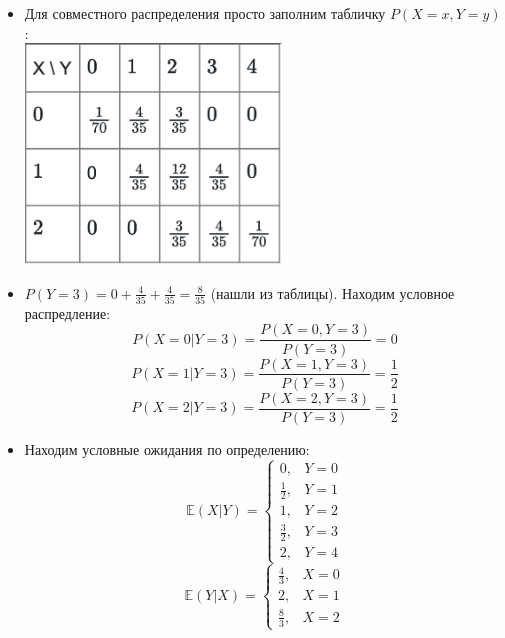 \begin{itemize}
\item Для совместного распределения просто заполним табличку $P\left(X = x, Y = y\right)$: \\
\includegraphics[width=193pt]{img1.png}
\item $P\left(Y = 3\right) = 0 + \frac{4}{35} + \frac{4}{35} = \frac{8}{35}$ (нашли из таблицы). Находим условное распредление:
\[
    P\left(X = 0 | Y = 3\right) = \frac{P\left(X = 0, Y = 3\right)}{P\left(Y = 3\right)} =0 
\]
\[
    P\left(X = 1 | Y = 3\right) = \frac{P\left(X = 1, Y = 3\right)}{P\left(Y = 3\right)} = \frac 1 2
\]
\[
    P\left(X = 2 | Y = 3\right) = \frac{P\left(X = 2, Y = 3\right)}{P\left(Y = 3\right)} = \frac 1 2
\]
\item Находим условные ожидания по определению:
\[
    \mathbb{E}\left(X | Y\right) = 
    \begin{cases}
    0, & Y = 0 \\
    \frac 1 2, & Y = 1 \\
    1, & Y = 2 \\
    \frac 3 2, & Y = 3 \\
    2, & Y = 4 
    \end{cases}
\]
\[
    \mathbb{E} \left(Y | X\right) = 
    \begin{cases}
    \frac 4 3, & X = 0 \\
    2 ,& X = 1\\
    \frac 8 3 ,& X = 2
    \end{cases}
\]
\end{itemize}
